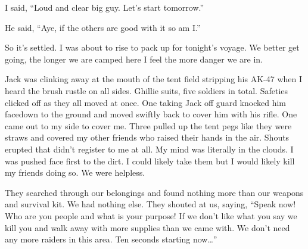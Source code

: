I said, ``Loud and clear big guy. Let's start tomorrow.''

He said, ``Aye, if the others are good with it so am I.''

So it's settled. I was about to rise to pack up for tonight's voyage. We better get going, the longer we are camped here I feel the more danger we are in.

Jack was clinking away at the mouth of the tent field stripping his AK-47 when I heard the brush rustle on all sides. Ghillie suits, five soldiers in total. Safeties clicked off as they all moved at once. One taking Jack off guard knocked him facedown to the ground and moved swiftly back to cover him with his rifle. One came out to my side to cover me. Three pulled up the tent pegs like they were straws and covered my other friends who raised their hands in the air. Shouts erupted that didn't register to me at all. My mind was literally in the clouds. I was pushed face first to the dirt. I could likely take them but I would likely kill my friends doing so. We were helpless.

They searched through our belongings and found nothing more than our weapons and survival kit. We had nothing else. They shouted at us, saying, ``Speak now! Who are you people and what is your purpose! If we don't like what you say we kill you and walk away with more supplies than we came with. We don't need any more raiders in this area. Ten seconds starting now\dots''

